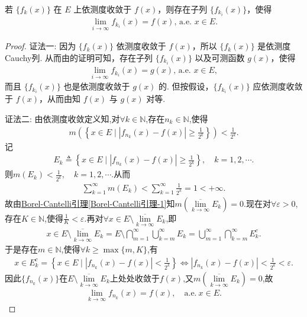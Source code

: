 \documentclass[../../main.tex]{subfiles}%
\begin{document}
\begin{theorem}[Riesz(里斯)定理]\label{theorem:Riesz定理}
若 $\{f_k(x)\}$ 在 $E$ 上依测度收敛于 $f(x)$，则存在子列 $\{f_{k_i}(x)\}$，使得
\begin{align*}
\lim_{i\to\infty}f_{k_i}(x)=f(x),\, \text{a.e. }x\in E.
\end{align*}
\end{theorem}
\begin{proof}

{\color{blue}证法一:}
因为 $\{f_k(x)\}$ 依测度收敛于 $f(x)$，所以 $\{f_k(x)\}$ 是依测度Cauchy列. 从而由的证明可知，存在子列 $\{f_{k_i}(x)\}$ 以及可测函数 $g(x)$，使得
\begin{align*}
\lim_{i\to\infty}f_{k_i}(x)=g(x),\,\text{a.e. }x\in E,
\end{align*}
而且 $\{f_{k_i}(x)\}$ 也是依测度收敛于 $g(x)$ 的. 但按假设，$\{f_{k_i}(x)\}$ 应依测度收敛于 $f(x)$，从而由知 $f(x)$ 与 $g(x)$ 对等. 

{\color{blue}证法二:}
由依测度收敛定义知,对$\forall k \in \mathbb{N}$,存在$n_k \in \mathbb{N}$,使得
\begin{align*}
m\left(\left\{x\in E \mid \left| f_{n_k}(x) - f(x) \right| \geqslant \frac{1}{2^k} \right\}\right) < \frac{1}{2^k}.
\end{align*}
记
\begin{align*}
E_k \triangleq \left\{x\in E \mid \left| f_{n_k}(x) - f(x) \right| \geqslant \frac{1}{2^k} \right\}, \quad k=1,2,\cdots.
\end{align*}
则$m(E_k) < \frac{1}{2^k}, \quad k=1,2,\cdots.$从而
\begin{align*}
\sum\limits_{k=1}^{\infty} m(E_k) < \sum\limits_{k=1}^{\infty} \frac{1}{2^k} = 1 < +\infty.
\end{align*}
故由\hyperref[theorem:Borel-Cantelli引理-1]{Borel-Cantelli引理\ref{Borel-Cantelli引理-1}}知$m\left( \underset{k\rightarrow \infty}{\overline{\lim }} E_k \right) = 0.$现在对$\forall \varepsilon > 0$,存在$K\in \mathbb{N}$,使得$\frac{1}{K} < \varepsilon.$再对$\forall x \in E \setminus \underset{k\rightarrow \infty}{\overline{\lim }} E_k$,即
\begin{align*}
x \in E \setminus \underset{k\rightarrow \infty}{\overline{\lim }} E_k = E \setminus \bigcap\limits_{m=1}^{\infty}\bigcup\limits_{k=m}^{\infty} E_k = \bigcup\limits_{m=1}^{\infty}\bigcap\limits_{k=m}^{\infty} E_k^c.
\end{align*}
于是存在$m \in \mathbb{N}$,使得$\forall k \geqslant \max\{m, K\}$,有
\begin{align*}
x \in E_k^c = \left\{x\in E \mid \left| f_{n_k}(x) - f(x) \right| < \frac{1}{2^k} \right\} \Longleftrightarrow \left| f_{n_k}(x) - f(x) \right| < \frac{1}{2^k} < \varepsilon.
\end{align*}
因此$\{f_{n_k}(x)\}$在$E \setminus \underset{k\rightarrow \infty}{\overline{\lim }} E_k$上处处收敛于$f(x)$,又$m\left( \underset{k\rightarrow \infty}{\overline{\lim }} E_k \right) = 0$,故
\begin{align*}
\lim_{k\rightarrow \infty} f_{n_k}(x) = f(x), \quad \mathrm{a}.\mathrm{e}. \ x \in E.
\end{align*}
\end{proof}
\end{document}
